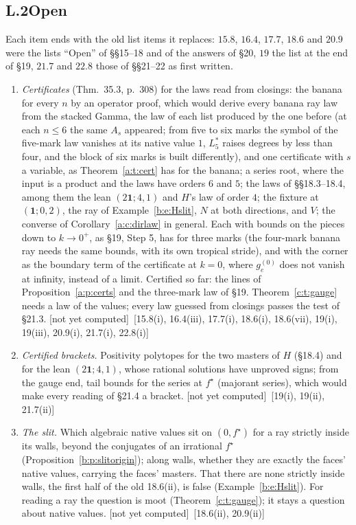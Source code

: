 \documentclass[11pt]{article}
\newcommand{\one}{\mathbf 1}
\theoremstyle{plain}
\theoremstyle{definition}
\theoremstyle{remark}
\newcommand{\notyet}{\textup{[not yet computed]}}
\begin{document}
\subsection*{L.2\quad Open}

Each item ends with the old list items it replaces: $15.8$, $16.4$, $17.7$, $18.6$ and $20.9$ were the lists ``Open'' of \S\S15--18 and of the answers of \S20, $19$ the list at the end of \S19, $21.7$ and $22.8$ those of \S\S21--22 as first written.

\begin{enumerate}[label=\textbf{O\arabic*},ref=O\arabic*,leftmargin=*,itemsep=4pt]
\item\label{o:certs} \emph{Certificates} (Thm.~35.3, p.~308) for the laws read from closings: the banana for every $n$ by an operator proof, which would derive every banana ray law from the stacked Gamma, the law of each list produced by the one before (at each $n\le6$ the same $A_s$ appeared; from five to six marks the symbol of the five-mark law vanishes at its native value $1$, $L_5^\ast$ raises degrees by less than four, and the block of six marks is built differently), and one certificate with $s$ a variable, as Theorem~\ref{a:t:cert} has for the banana; a series root, where the input is a product and the laws have orders $6$ and $5$; the laws of \S\S18.3--18.4, among them the lean $(2\one;4,1)$ and $H$'s law of order $4$; the fixture at $(\one;0,2)$, the ray of Example~\ref{b:e:Hslit}, $N$ at both directions, and $V$; the converse of Corollary~\ref{a:c:dirlaw} in general. Each with bounds on the pieces down to $k\to0^+$, as \S19, Step 5, has for three marks (the four-mark banana ray needs the same bounds, with its own tropical stride), and with the corner as the boundary term of the certificate at $k=0$, where $g^{(0)}_e$ does not vanish at infinity, instead of a limit. Certified so far: the lines of Proposition~\ref{a:p:certs} and the three-mark law of \S19. Theorem~\ref{c:t:gauge} needs a law of the values; every law guessed from closings passes the test of \S21.3. \notyet\ {\small[15.8(i), 16.4(iii), 17.7(i), 18.6(i), 18.6(vii), 19(i), 19(iii), 20.9(i), 21.7(i), 22.8(i)]}
\item\label{o:brackets} \emph{Certified brackets.} Positivity polytopes for the two masters of $H$ (\S18.4) and for the lean $(2\one;4,1)$, whose rational solutions have unproved signs; from the gauge end, tail bounds for the series at $f^\star$ (majorant series), which would make every reading of \S21.4 a bracket. \notyet\ {\small[19(i), 19(ii), 21.7(ii)]}
\item\label{o:slit} \emph{The slit.} Which algebraic native values sit on $(0,f^\star)$ for a ray strictly inside its walls, beyond the conjugates of an irrational $f^\star$ (Proposition~\ref{b:p:slitorigin}); along walls, whether they are exactly the faces' native values, carrying the faces' masters. That there are none strictly inside walls, the first half of the old 18.6(ii), is false (Example~\ref{b:e:Hslit}). For reading a ray the question is moot (Theorem~\ref{c:t:gauge}); it stays a question about native values. \notyet\ {\small[18.6(ii), 20.9(ii)]}

\end{enumerate}
\end{document}
